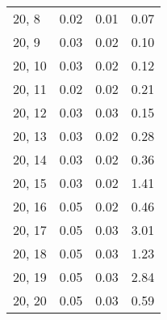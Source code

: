 \begin{table}
\begin{tabular}{llll}
20, 8  &  0.02 &  0.01 &  0.07 \\
20, 9  &  0.03 &  0.02 &  0.10 \\
20, 10 &  0.03 &  0.02 &  0.12 \\
20, 11 &  0.02 &  0.02 &  0.21 \\
20, 12 &  0.03 &  0.03 &  0.15 \\
20, 13 &  0.03 &  0.02 &  0.28 \\
20, 14 &  0.03 &  0.02 &  0.36 \\
20, 15 &  0.03 &  0.02 &  1.41 \\
20, 16 &  0.05 &  0.02 &  0.46 \\
20, 17 &  0.05 &  0.03 &  3.01 \\
20, 18 &  0.05 &  0.03 &  1.23 \\
20, 19 &  0.05 &  0.03 &  2.84 \\
20, 20 &  0.05 &  0.03 &  0.59 \\
\bottomrule
\end{tabular}
\end{table}
